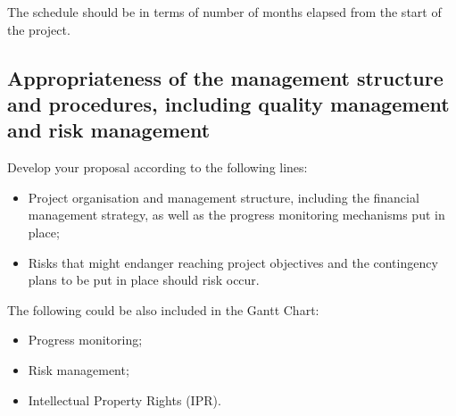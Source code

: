 \documentclass[a4paper,11pt]{article}
\begin{document}
The schedule should be in terms of number of months elapsed from the start of the project.

\subsection{Appropriateness of the management structure and procedures, including quality management and risk management}

Develop your proposal according to the following lines:
\begin{itemize}
\item Project organisation and management structure, including the financial management strategy, as well as the progress monitoring mechanisms put in place;
\item Risks that might endanger reaching project objectives and the contingency plans to be put in place should risk occur.
\end{itemize}
The following could be also included in the Gantt Chart:
\begin{itemize}
\item Progress monitoring;
\item Risk management;
\item Intellectual Property Rights (IPR).
\end{itemize}
\end{document}
